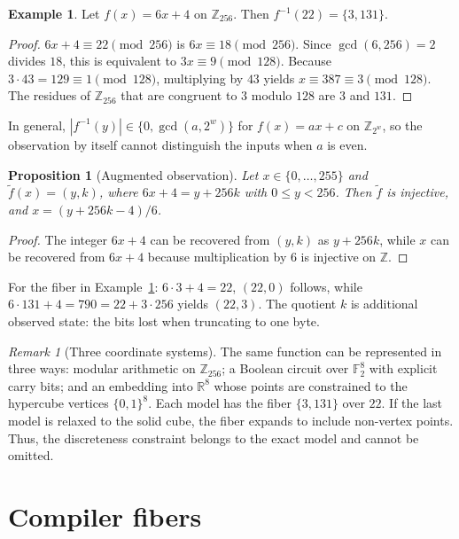 \documentclass[11pt]{article}
\newtheorem{proposition}[theorem]{Proposition}
\theoremstyle{definition}
\newtheorem{example}[theorem]{Example}
\theoremstyle{remark}
\newtheorem{remark}[theorem]{Remark}
\newcommand{\Z}{\mathbb{Z}}
\newcommand{\F}{\mathbb{F}}
\begin{document}
\begin{example}\label{ex:fiber}
Let $f(x) = 6x + 4$ on $\Z_{256}$. Then $f^{-1}(22) = \{3, 131\}$.
\end{example}

\begin{proof}
$6x + 4 \equiv 22 \pmod{256}$ is $6x \equiv 18 \pmod{256}$. Since $\gcd(6,256) = 2$ divides $18$, this is equivalent to $3x \equiv 9 \pmod{128}$. Because $3 \cdot 43 = 129 \equiv 1 \pmod{128}$, multiplying by $43$ yields $x \equiv 387 \equiv 3 \pmod{128}$. The residues of $\Z_{256}$ that are congruent to $3$ modulo $128$ are $3$ and $131$.
\end{proof}

In general, $|f^{-1}(y)| \in \{0, \gcd(a, 2^w)\}$ for $f(x) = ax + c$ on $\Z_{2^w}$, so the observation by itself cannot distinguish the inputs when $a$ is even.

\begin{proposition}[Augmented observation]
Let $x \in \{0, \dots, 255\}$ and $\tilde f(x) = (y, k)$, where $6x + 4 = y + 256k$ with $0 \le y < 256$. Then $\tilde f$ is injective, and $x = (y + 256k - 4)/6$.
\end{proposition}

\begin{proof}
The integer $6x + 4$ can be recovered from $(y,k)$ as $y + 256k$, while $x$ can be recovered from $6x + 4$ because multiplication by $6$ is injective on $\Z$.
\end{proof}

For the fiber in Example~\ref{ex:fiber}: $6 \cdot 3 + 4 = 22$, $(22, 0)$ follows, while $6 \cdot 131 + 4 = 790 = 22 + 3 \cdot 256$ yields $(22, 3)$. The quotient $k$ is additional observed state: the bits lost when truncating to one byte.

\begin{remark}[Three coordinate systems]
The same function can be represented in three ways: modular arithmetic on $\Z_{256}$; a Boolean circuit over $\F_2^8$ with explicit carry bits; and an embedding into $\mathbb{R}^8$ whose points are constrained to the hypercube vertices $\{0,1\}^8$. Each model has the fiber $\{3,131\}$ over $22$. If the last model is relaxed to the solid cube, the fiber expands to include non-vertex points. Thus, the discreteness constraint belongs to the exact model and cannot be omitted.
\end{remark}

\section{Compiler fibers}
\end{document}
